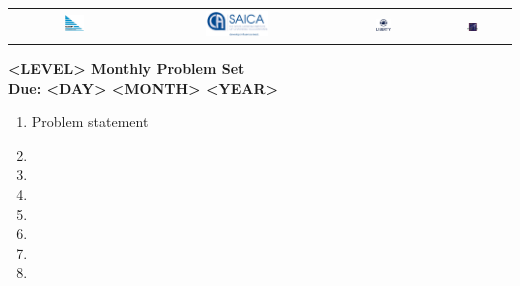 \documentclass{article}
\begin{document}
\setlength{\tabcolsep}{0.015\textwidth}
\begin{center} \begin{tabular}{cccc}
	\includegraphics[width=0.16\textwidth]{SAMF_logo.jpg} &
	\includegraphics[width=0.35\textwidth]{SAICA_logo.jpg} &
	\includegraphics[width=0.18\textwidth]{Liberty_logo.jpg} &
	\includegraphics[width=0.18\textwidth]{SAMO2019.png}
\end{tabular} \end{center}


\bigskip \bigskip

\begin{center}
\textbf{\Large <LEVEL> Monthly Problem Set}
\\ \vspace{1em}
\textbf{\large Due: <DAY> <MONTH> <YEAR>}
\end{center}

\begin{enumerate}[1.]

\vspace{6pt}
\item %
Problem statement


\vspace{6pt}
\item


\vspace{6pt}
\item


\vspace{6pt}
\item


\vspace{6pt}
\item


\vspace{6pt}
\item


\vspace{6pt}
\item


\vspace{6pt}
\item


\end{enumerate}
\end{document}
